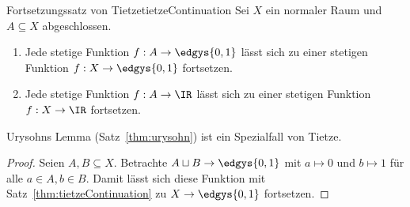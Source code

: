 \documentclass[language=ngerman]{TemplateLecture} %
\begin{document}


\begin{thm}{Fortsetzungssatz von Tietze}{tietzeContinuation}
    Sei $X$ ein normaler Raum und $A \subseteq X$ abgeschlossen.
    \begin{enumerate}[$(i)$]
        \item Jede stetige Funktion $f: A \to \edgys{0,1}$ lässt sich zu einer stetigen Funktion $f: X \to \edgys{0,1}$ fortsetzen.
        \item Jede stetige Funktion $f: A \to \IR$ lässt sich zu einer stetigen Funktion $f: X \to \IR$ fortsetzen.
    \end{enumerate}
\end{thm}

\begin{rmk}
    Urysohns Lemma (Satz~\ref{thm:urysohn}) ist ein Spezialfall von Tietze.

    \begin{proof}
        Seien $A, B \subseteq X$. Betrachte $A \sqcup B \to \edgys{0,1}$ mit $a \mapsto 0$ und $b \mapsto 1$ für alle $a \in A, b \in B$. Damit lässt sich diese Funktion mit Satz~\ref{thm:tietzeContinuation} zu $X \to \edgys{0,1}$ fortsetzen.
    \end{proof}
\end{rmk}
\end{document}
